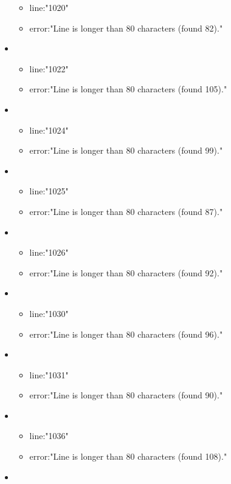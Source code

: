 \begin{itemize}
\begin{itemize}
		\item line:"1020" 
		\item error:"Line is longer than 80 characters (found 82)." 
	\end{itemize}
	\item 
	\begin{itemize} 
		\item line:"1022" 
		\item error:"Line is longer than 80 characters (found 105)." 
	\end{itemize}
	\item 
	\begin{itemize} 
		\item line:"1024" 
		\item error:"Line is longer than 80 characters (found 99)." 
	\end{itemize}
	\item 
	\begin{itemize} 
		\item line:"1025" 
		\item error:"Line is longer than 80 characters (found 87)." 
	\end{itemize}
	\item 
	\begin{itemize} 
		\item line:"1026" 
		\item error:"Line is longer than 80 characters (found 92)." 
	\end{itemize}
	\item 
	\begin{itemize} 
		\item line:"1030" 
		\item error:"Line is longer than 80 characters (found 96)." 
	\end{itemize}
	\item 
	\begin{itemize} 
		\item line:"1031" 
		\item error:"Line is longer than 80 characters (found 90)." 
	\end{itemize}
	\item 
	\begin{itemize} 
		\item line:"1036" 
		\item error:"Line is longer than 80 characters (found 108)." 
	\end{itemize}
	\item 
	\begin{itemize} 

\end{itemize}
\end{itemize}
